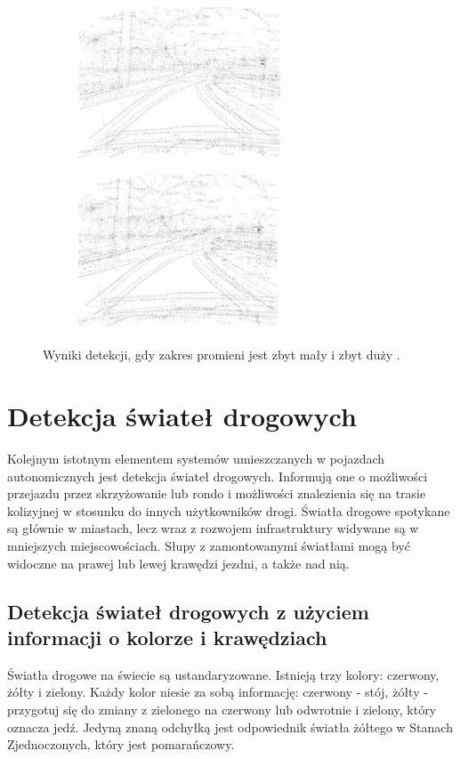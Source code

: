 \begin{figure}[h]
	\centering
	\begin{subfigure}{0.35\textwidth}
		\centering
		\includegraphics[width=6cm]{img/znaki2.png}
		\subcaption{\label{fig:znaki2}}
	\end{subfigure}
	\begin{subfigure}{0.35\textwidth}
		\centering
		\includegraphics[width=6cm]{img/znaki3.png}
		\subcaption{\label{fig:znaki3}}
	\end{subfigure}
	
	\caption{\label{fig:details}Wyniki detekcji, gdy zakres promieni jest zbyt mały \protect{} i zbyt duży \protect{}.\cite{T2}}
\end{figure}

\section{Detekcja świateł drogowych}
\label{sec:tl}
Kolejnym istotnym elementem systemów umieszczanych w pojazdach autonomicznych jest detekcja świateł drogowych. Informują one o możliwości przejazdu przez skrzyżowanie lub rondo i możliwości znalezienia się na trasie kolizyjnej w stosunku do innych użytkowników drogi. Światła drogowe spotykane są głównie w miastach, lecz wraz z rozwojem infrastruktury widywane są w mniejszych miejscowościach. Słupy z zamontowanymi światłami mogą być widoczne na prawej lub lewej krawędzi jezdni, a także nad nią.

\subsection{Detekcja świateł drogowych z użyciem informacji o kolorze i krawędziach}
Światła drogowe na świecie są ustandaryzowane. Istnieją trzy kolory: czerwony, żółty i zielony. Każdy kolor niesie za sobą informację: czerwony - stój, żółty - przygotuj się do zmiany z zielonego na czerwony lub odwrotnie i zielony, który oznacza jedź. Jedyną znaną odchyłką jest odpowiednik światła żółtego w Stanach Zjednoczonych, który jest pomarańczowy.

